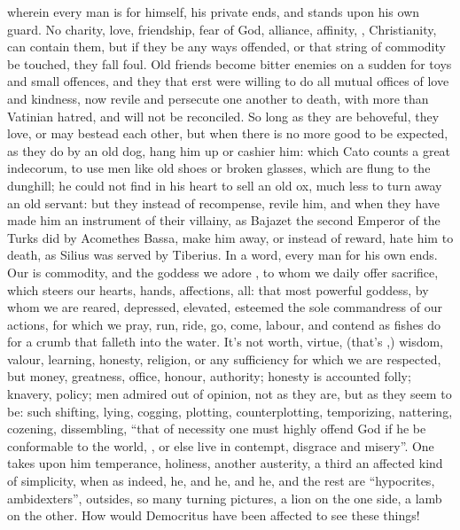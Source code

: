 wherein every man is for himself, his private ends, and stands upon his own
guard. No charity, love, friendship, fear of God, alliance,
affinity, , Christianity, can
contain them, but if they be any ways offended, or that string of commodity be
touched, they fall foul. Old friends become bitter enemies on a sudden for toys
and small offences, and they that erst were willing to do all mutual offices of
love and kindness, now revile and persecute one another to death, with more
than Vatinian hatred, and will not be reconciled. So long as they are
behoveful, they love, or may bestead each other, but when there is no more good
to be expected, as they do by an old dog, hang him up or cashier him: which
Cato counts a great indecorum, to use men like old shoes or
broken glasses, which are flung to the dunghill; he could not find in his heart
to sell an old ox, much less to turn away an old servant: but they instead of
recompense, revile him, and when they have made him an instrument of their
villainy, as Bajazet the second Emperor of the Turks did by
Acomethes Bassa, make him away, or instead of reward, hate
him to death, as Silius was served by Tiberius. In a word, every man for his
own ends. Our  is commodity, and the goddess we adore , to whom we daily offer sacrifice, which steers our
hearts, hands, affections, all: that most powerful goddess,
by whom we are reared, depressed, elevated, esteemed the
sole commandress of our actions, for which we pray, run, ride, go, come,
labour, and contend as fishes do for a crumb that falleth into the water. It's
not worth, virtue, (that's ,) wisdom, valour, learning,
honesty, religion, or any sufficiency for which we are respected, but
money, greatness, office, honour, authority; honesty is
accounted folly; knavery, policy; men admired out of
opinion, not as they are, but as they seem to be: such shifting, lying,
cogging, plotting, counterplotting, temporizing, nattering, cozening,
dissembling, \enquote{that of necessity one must highly offend God
if he be conformable to the world, , or else live in
contempt, disgrace and misery}. One takes upon him temperance, holiness,
another austerity, a third an affected kind of simplicity, when as indeed, he,
and he, and he, and the rest are \enquote{hypocrites, ambidexters},
outsides, so many turning pictures, a lion on the one side, a lamb on the
other. How would Democritus have been affected to see these
things!

